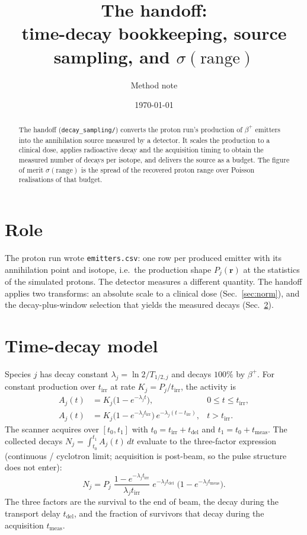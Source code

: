 \documentclass[11pt]{article}
\title{The handoff:\\
time-decay bookkeeping, source sampling, and $\sigma(\text{range})$}
\author{Method note}
\date{\today}
\newcommand{\tirr}{t_{\mathrm{irr}}}
\newcommand{\tdel}{t_{\mathrm{del}}}
\newcommand{\tmeas}{t_{\mathrm{meas}}}
\begin{document}
\maketitle

\begin{abstract}
The handoff (\texttt{decay\_sampling/}) converts the proton run's production
of $\beta^{+}$ emitters into the annihilation source measured by a detector. It
scales the production to a clinical dose, applies radioactive decay and the
acquisition timing to obtain the measured number of decays per isotope, and
delivers the source as a budget. The figure of merit $\sigma(\text{range})$ is
the spread of the recovered proton range over Poisson realisations of that
budget.
\end{abstract}

\section{Role}

The proton run wrote \texttt{emitters.csv}: one row per produced emitter with its
annihilation point and isotope, i.e.\ the production shape $P_j(\mathbf r)$ at
the statistics of the simulated protons. The detector measures a different
quantity. The handoff applies two transforms: an absolute scale to a clinical
dose (Sec.~\ref{sec:norm}), and the decay-plus-window selection that yields the
measured decays (Sec.~\ref{sec:decay}).

\section{Time-decay model}
\label{sec:decay}

Species $j$ has decay constant $\lambda_j=\ln2/T_{1/2,j}$ and decays $100\%$ by
$\beta^{+}$. For constant production over $\tirr$ at rate $K_j=P_j/\tirr$, the
activity is
\begin{align}
A_j(t) &= K_j\bigl(1-e^{-\lambda_j t}\bigr), & 0\le t\le \tirr,\\
A_j(t) &= K_j\bigl(1-e^{-\lambda_j \tirr}\bigr)\,e^{-\lambda_j (t-\tirr)},
       & t>\tirr.
\end{align}
The scanner acquires over $[t_0,t_1]$ with $t_0=\tirr+\tdel$ and
$t_1=t_0+\tmeas$. The collected decays $N_j=\int_{t_0}^{t_1}A_j(t)\,dt$ evaluate
to the three-factor expression (continuous / cyclotron limit; acquisition is
post-beam, so the pulse structure does not enter):
\begin{equation}
N_j = P_j\;
\frac{1-e^{-\lambda_j \tirr}}{\lambda_j \tirr}\;
e^{-\lambda_j \tdel}\;
\bigl(1-e^{-\lambda_j \tmeas}\bigr).
\label{eq:nmeas}
\end{equation}
The three factors are the survival to the end of beam, the decay during the
transport delay $\tdel$, and the fraction of survivors that decay during the
acquisition $\tmeas$.
\end{document}
